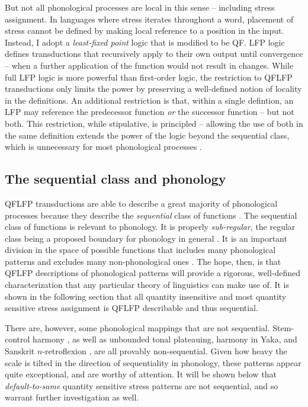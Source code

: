 \documentclass[12pt]{article}
\begin{document}
But not all phonological processes are local in this sense -- including stress assignment. In languages where stress iterates throughout a word, placement of stress cannot be defined by making local reference to a position in the input. Instead, I adopt a \textit{least-fixed point} logic \citep[LFP]{libkin04} that is modified to be QF. LFP logic defines transductions that recursively apply to their own output until convergence -- when a further application of the function would not result in changes. While full LFP logic is more powerful than first-order logic, the restriction to QFLFP transductions only limits the power by preserving a well-defined notion of locality in the definitions. An additional restriction is that, within a single defintion, an LFP may reference the predecessor function \textit{or} the successor function -- but not both. This restriction, while stipulative, is principled -- allowing the use of both in the same definition extends the power of the logic beyond the sequential class, which is unnecessary for most phonological processes \citep{chandlee14,chandJardSeq}.%


\subsection{The sequential class and phonology}
 
QFLFP transductions are able to describe a great majority of phonological processes because they describe the \textit{sequential} class of functions \citep{chandJardSeq}. The sequential class of functions \citep{mohiri97} is relevant to phonology. It is properly \textit{sub-regular}, the regular class being a proposed boundary for phonology in general \citep{johnson72,kaplankay,heinz15}. It is an important division in the space of possible functions that includes many phonological patterns and excludes many non-phonological ones \citep{heinzlai13,chandlee14,jardine16}. The hope, then, is that QFLFP descriptions of phonological patterns will provide a rigorous, well-defined characterization that any particular theory of linguistics can make use of. It is shown in the following section that all quantity insensitive and most quantity sensitive stress assignment is QFLFP describable and thus sequential.

There are, however, some phonological mappings that are not sequential. Stem-control harmony \citep{heinzlai13}, as well as unbounded tonal plateauing, harmony in Yaka, and Sanskrit $n$-retroflexion \citep{jardine16}, are all provably non-sequential. Given how heavy the scale is tilted in the direction of sequentiality in phonology, these patterns appear quite exceptional, and are worthy of attention. It will be shown below that \textit{default-to-same} quantity sensitive stress patterns are not sequential, and so warrant further investigation as well. 
\end{document}
